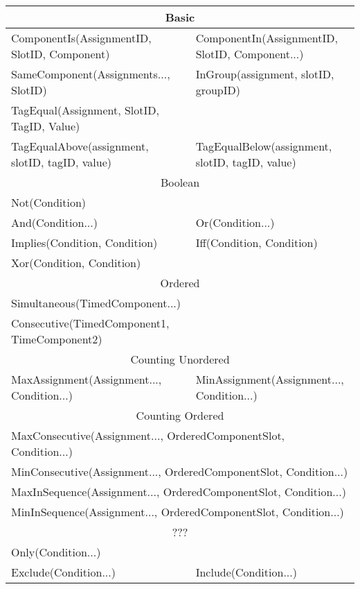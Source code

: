 \def\arraystretch{1.5}
\begin{tabular}{|p{} p{}|}
	
	\hline
	\multicolumn{2}{|c|}{Basic} \\
	\hline
	ComponentIs(AssignmentID, SlotID, Component) &	ComponentIn(AssignmentID, SlotID, Component...) \\	
	SameComponent(Assignments..., SlotID) & InGroup(assignment, slotID, groupID) \\
	TagEqual(Assignment, SlotID, TagID, Value) & \\
	TagEqualAbove(assignment, slotID, tagID, value) & TagEqualBelow(assignment, slotID, tagID, value) \\
	
	\hline
	\multicolumn{2}{|c|}{Boolean} \\
	\hline
	Not(Condition)	& \\
	And(Condition...)	&	Or(Condition...) \\
	Implies(Condition, Condition)	&	Iff(Condition, Condition) \\
	Xor(Condition, Condition)	& \\
	
	\hline
	\multicolumn{2}{|c|}{Ordered} \\
	\hline
	Simultaneous(TimedComponent...)	& \\
	Consecutive(TimedComponent1, TimeComponent2)	& \\
	
	\hline
	\multicolumn{2}{|c|}{Counting Unordered} \\
	\hline
	MaxAssignment(Assignment..., Condition...)	& 	MinAssignment(Assignment..., Condition...) \\
	
	\hline
	\multicolumn{2}{|c|}{Counting Ordered} \\
	\hline
	\multicolumn{2}{|l|}{MaxConsecutive(Assignment..., OrderedComponentSlot, Condition...)} \\
	\multicolumn{2}{|l|}{MinConsecutive(Assignment..., OrderedComponentSlot, Condition...)}	\\
	\multicolumn{2}{|l|}{MaxInSequence(Assignment..., OrderedComponentSlot, Condition...)}	\\
	\multicolumn{2}{|l|}{MinInSequence(Assignment..., OrderedComponentSlot, Condition...)}	\\
	
	\hline
	\multicolumn{2}{|c|}{???} \\
	\hline
	Only(Condition...) & \\
	Exclude(Condition...)	&	Include(Condition...) \\
	
	\hline

\end{tabular}
\def\arraystretch{1}